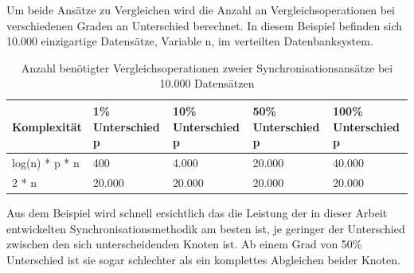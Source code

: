 \documentclass[a4paper,11pt,oneside,%
headsepline,												%
footsepline,												%
bibtotocnumbered									%
]{scrreprt}
\begin{document}
Um beide Ansätze zu Vergleichen wird die Anzahl an Vergleichsoperationen bei verschiedenen Graden an Unterschied berechnet. In diesem Beispiel befinden sich 10.000 einzigartige Datensätze, Variable n, im verteilten Datenbanksystem.

\begin{table}[h!]
\centering
    \begin{tabular}{| l | l | l | l | l |}
    \hline
    Komplexität & 1\% Unterschied p & 10\% Unterschied p & 50\% Unterschied p & 100\% Unterschied p\\ \hline
    log(n) * p * n & 400 & 4.000 & 20.000 & 40.000 \\ \hline
    2 * n & 20.000 & 20.000 & 20.000 & 20.000\\ \hline
    \end{tabular}
\caption{Anzahl benötigter Vergleichsoperationen zweier Synchronisationsansätze bei 10.000 Datensätzen}
\label{table:1}
\end{table}

Aus dem Beispiel wird schnell ersichtlich das die Leistung der in dieser Arbeit entwickelten Synchronisationsmethodik am besten ist, je geringer der Unterschied zwischen den sich unterscheidenden Knoten ist. Ab einem Grad von 50\% Unterschied ist sie sogar schlechter als ein komplettes Abgleichen beider Knoten.
	
\end{document}
